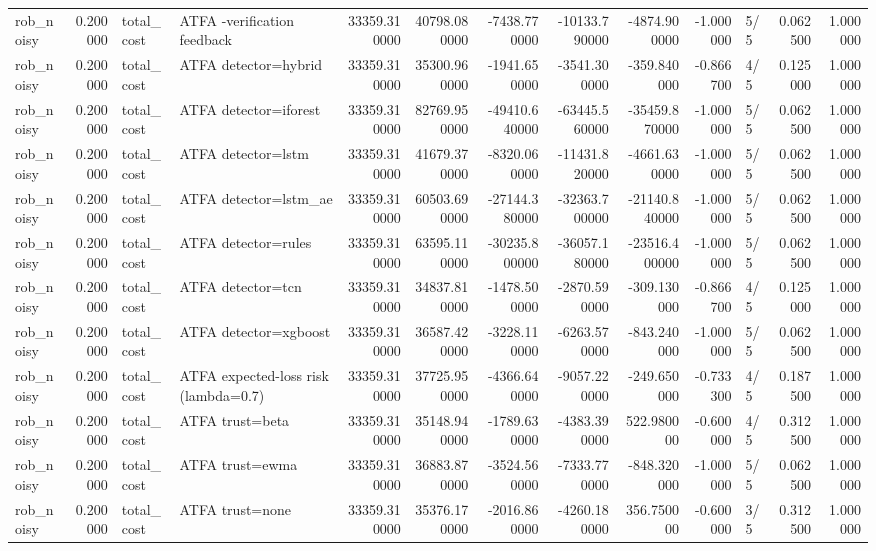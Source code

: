 \begin{tabular}{lrllrrrrrrlrr}
rob\_noisy & 0.200000 & total\_cost & ATFA -verification feedback & 33359.310000 & 40798.080000 & -7438.770000 & -10133.790000 & -4874.900000 & -1.000000 & 5/5 & 0.062500 & 1.000000 \\
rob\_noisy & 0.200000 & total\_cost & ATFA detector=hybrid & 33359.310000 & 35300.960000 & -1941.650000 & -3541.300000 & -359.840000 & -0.866700 & 4/5 & 0.125000 & 1.000000 \\
rob\_noisy & 0.200000 & total\_cost & ATFA detector=iforest & 33359.310000 & 82769.950000 & -49410.640000 & -63445.560000 & -35459.870000 & -1.000000 & 5/5 & 0.062500 & 1.000000 \\
rob\_noisy & 0.200000 & total\_cost & ATFA detector=lstm & 33359.310000 & 41679.370000 & -8320.060000 & -11431.820000 & -4661.630000 & -1.000000 & 5/5 & 0.062500 & 1.000000 \\
rob\_noisy & 0.200000 & total\_cost & ATFA detector=lstm\_ae & 33359.310000 & 60503.690000 & -27144.380000 & -32363.700000 & -21140.840000 & -1.000000 & 5/5 & 0.062500 & 1.000000 \\
rob\_noisy & 0.200000 & total\_cost & ATFA detector=rules & 33359.310000 & 63595.110000 & -30235.800000 & -36057.180000 & -23516.400000 & -1.000000 & 5/5 & 0.062500 & 1.000000 \\
rob\_noisy & 0.200000 & total\_cost & ATFA detector=tcn & 33359.310000 & 34837.810000 & -1478.500000 & -2870.590000 & -309.130000 & -0.866700 & 4/5 & 0.125000 & 1.000000 \\
rob\_noisy & 0.200000 & total\_cost & ATFA detector=xgboost & 33359.310000 & 36587.420000 & -3228.110000 & -6263.570000 & -843.240000 & -1.000000 & 5/5 & 0.062500 & 1.000000 \\
rob\_noisy & 0.200000 & total\_cost & ATFA expected-loss risk (lambda=0.7) & 33359.310000 & 37725.950000 & -4366.640000 & -9057.220000 & -249.650000 & -0.733300 & 4/5 & 0.187500 & 1.000000 \\
rob\_noisy & 0.200000 & total\_cost & ATFA trust=beta & 33359.310000 & 35148.940000 & -1789.630000 & -4383.390000 & 522.980000 & -0.600000 & 4/5 & 0.312500 & 1.000000 \\
rob\_noisy & 0.200000 & total\_cost & ATFA trust=ewma & 33359.310000 & 36883.870000 & -3524.560000 & -7333.770000 & -848.320000 & -1.000000 & 5/5 & 0.062500 & 1.000000 \\
rob\_noisy & 0.200000 & total\_cost & ATFA trust=none & 33359.310000 & 35376.170000 & -2016.860000 & -4260.180000 & 356.750000 & -0.600000 & 3/5 & 0.312500 & 1.000000 \\

\end{tabular}
